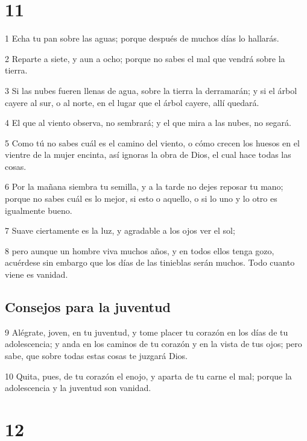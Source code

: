 \chapter{11}

\par 1 Echa tu pan sobre las aguas; porque después de muchos días lo hallarás.
\par 2 Reparte a siete, y aun a ocho; porque no sabes el mal que vendrá sobre la tierra.
\par 3 Si las nubes fueren llenas de agua, sobre la tierra la derramarán; y si el árbol cayere al sur, o al norte, en el lugar que el árbol cayere, allí quedará.
\par 4 El que al viento observa, no sembrará; y el que mira a las nubes, no segará.
\par 5 Como tú no sabes cuál es el camino del viento, o cómo crecen los huesos en el vientre de la mujer encinta, así ignoras la obra de Dios, el cual hace todas las cosas.
\par 6 Por la mañana siembra tu semilla, y a la tarde no dejes reposar tu mano; porque no sabes cuál es lo mejor, si esto o aquello, o si lo uno y lo otro es igualmente bueno.
\par 7 Suave ciertamente es la luz, y agradable a los ojos ver el sol;
\par 8 pero aunque un hombre viva muchos años, y en todos ellos tenga gozo, acuérdese sin embargo que los días de las tinieblas serán muchos. Todo cuanto viene es vanidad.

\section*{Consejos para la juventud}

\par 9 Alégrate, joven, en tu juventud, y tome placer tu corazón en los días de tu adolescencia; y anda en los caminos de tu corazón y en la vista de tus ojos; pero sabe, que sobre todas estas cosas te juzgará Dios.
\par 10 Quita, pues, de tu corazón el enojo, y aparta de tu carne el mal; porque la adolescencia y la juventud son vanidad.

\chapter{12}

